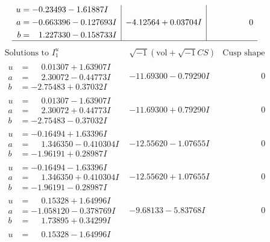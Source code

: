 \documentclass[1p]{elsarticle_modified}
\theoremstyle{definition}
\newcommand{\I}{\sqrt{-1}}
\begin{document}
$$\begin{array}{c|c|c}
\begin{aligned}
u &= -0.23493 - 1.61887 I \\
a &= -0.663396 - 0.127693 I \\
b &= \phantom{-}1.227330 - 0.158733 I\end{aligned}
 & -4.12564 + 0.03704 I & \phantom{-0.000000 } 0\\
 \hline 
 \end{array}$$\newpage$$\begin{array}{c|c|c}  
\text{Solutions to }I^u_{1}& \I (\text{vol} + \sqrt{-1}CS) & \text{Cusp shape}\\
 \hline 
\begin{aligned}
u &= \phantom{-}0.01307 + 1.63907 I \\
a &= \phantom{-}2.30072 - 0.44773 I \\
b &= -2.75483 + 0.37032 I\end{aligned}
 & -11.69300 - 0.79290 I & \phantom{-0.000000 } 0 \\ \hline\begin{aligned}
u &= \phantom{-}0.01307 - 1.63907 I \\
a &= \phantom{-}2.30072 + 0.44773 I \\
b &= -2.75483 - 0.37032 I\end{aligned}
 & -11.69300 + 0.79290 I & \phantom{-0.000000 } 0 \\ \hline\begin{aligned}
u &= -0.16494 + 1.63396 I \\
a &= \phantom{-}1.346350 - 0.410304 I \\
b &= -1.96191 + 0.28987 I\end{aligned}
 & -12.55620 - 1.07655 I & \phantom{-0.000000 } 0 \\ \hline\begin{aligned}
u &= -0.16494 - 1.63396 I \\
a &= \phantom{-}1.346350 + 0.410304 I \\
b &= -1.96191 - 0.28987 I\end{aligned}
 & -12.55620 + 1.07655 I & \phantom{-0.000000 } 0 \\ \hline\begin{aligned}
u &= \phantom{-}0.15328 + 1.64996 I \\
a &= -1.058120 - 0.378769 I \\
b &= \phantom{-}1.73895 + 0.34299 I\end{aligned}
 & -9.68133 - 5.83768 I & \phantom{-0.000000 } 0 \\ \hline\begin{aligned}
u &= \phantom{-}0.15328 - 1.64996 I \\

\end{aligned}
\end{array}$$
\end{document}
